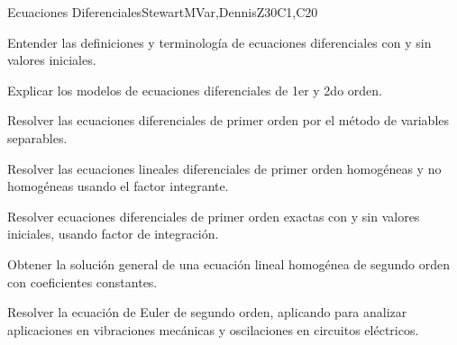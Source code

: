 \begin{syllabus}
\begin{unit}{Ecuaciones Diferenciales}{}{StewartMVar,DennisZ}{30}{C1,C20}
  \begin{learningoutcomes}
    \item Entender las definiciones y terminología de ecuaciones diferenciales con y sin valores iniciales.
    \item Explicar los modelos de ecuaciones diferenciales de 1er y 2do orden.
    \item Resolver las ecuaciones diferenciales de primer orden por el método de variables separables.
    \item Resolver las ecuaciones lineales diferenciales de primer orden homogéneas y no homogéneas usando el factor integrante.
    \item Resolver ecuaciones diferenciales de primer orden exactas con y sin valores iniciales, usando factor de integración.
    \item Obtener la solución general de una ecuación lineal homogénea de segundo orden con coeficientes constantes.
    \item Resolver la ecuación de Euler de segundo orden, aplicando para analizar aplicaciones en vibraciones mecánicas y oscilaciones en circuitos eléctricos.
    \end{learningoutcomes}
\end{unit}

\begin{coursebibliography}
\end{coursebibliography}

\end{syllabus}
